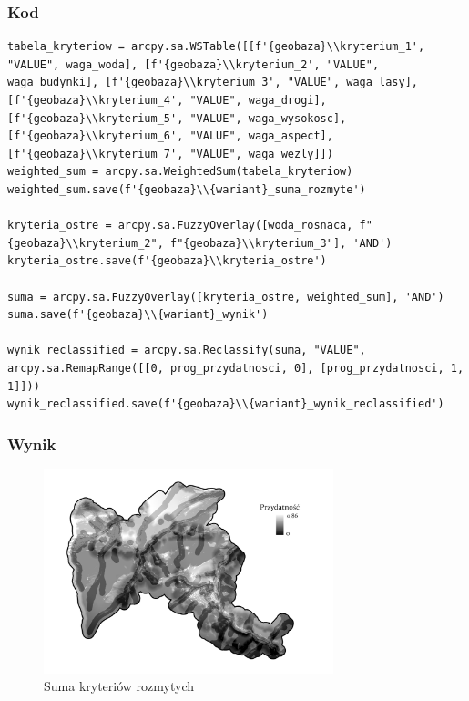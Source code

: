 \documentclass{article}
\begin{document}
\subsubsection{Kod}
\begin{lstlisting}
tabela_kryteriow = arcpy.sa.WSTable([[f'{geobaza}\\kryterium_1', "VALUE", waga_woda], [f'{geobaza}\\kryterium_2', "VALUE", waga_budynki], [f'{geobaza}\\kryterium_3', "VALUE", waga_lasy], [f'{geobaza}\\kryterium_4', "VALUE", waga_drogi], [f'{geobaza}\\kryterium_5', "VALUE", waga_wysokosc], [f'{geobaza}\\kryterium_6', "VALUE", waga_aspect], [f'{geobaza}\\kryterium_7', "VALUE", waga_wezly]])
weighted_sum = arcpy.sa.WeightedSum(tabela_kryteriow)
weighted_sum.save(f'{geobaza}\\{wariant}_suma_rozmyte')

kryteria_ostre = arcpy.sa.FuzzyOverlay([woda_rosnaca, f"{geobaza}\\kryterium_2", f"{geobaza}\\kryterium_3"], 'AND')
kryteria_ostre.save(f'{geobaza}\\kryteria_ostre')

suma = arcpy.sa.FuzzyOverlay([kryteria_ostre, weighted_sum], 'AND')
suma.save(f'{geobaza}\\{wariant}_wynik')

wynik_reclassified = arcpy.sa.Reclassify(suma, "VALUE", arcpy.sa.RemapRange([[0, prog_przydatnosci, 0], [prog_przydatnosci, 1, 1]]))
wynik_reclassified.save(f'{geobaza}\\{wariant}_wynik_reclassified')
\end{lstlisting}

\subsubsection{Wynik}
\begin{figure}[H]
    \centering
    \includegraphics[width=0.75\textwidth]{img/rozmyte-layout.jpg}
    \caption*{Suma kryteriów rozmytych}
\end{figure}
\end{document}
